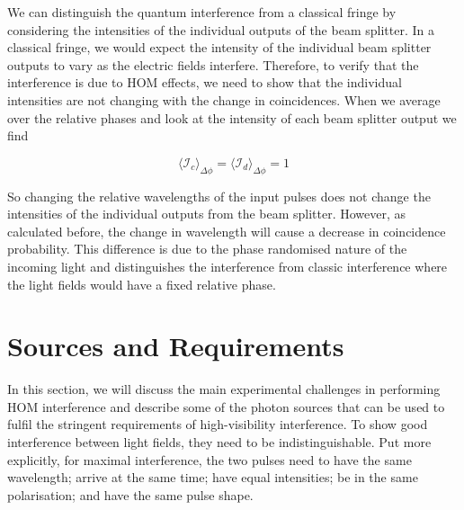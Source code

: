 We can distinguish the quantum interference from a classical fringe by considering the intensities of the individual outputs of the beam splitter. In a classical fringe, we would expect the intensity of the individual beam splitter outputs to vary as the electric fields interfere. Therefore, to verify that the interference is due to \ac{HOM} effects, we need to show that the individual intensities are not changing with the change in coincidences. When we average over the relative phases and look at the intensity of each beam splitter output we find

\begin{equation}
	\langle \mathcal{I}_c \rangle_{\Delta\phi} = \langle \mathcal{I}_d \rangle_{\Delta\phi} = 1
\end{equation}

So changing the relative wavelengths of the input pulses does not change the intensities of the individual outputs from the beam splitter. However, as calculated before, the change in wavelength will cause a decrease in coincidence probability. This difference is due to the phase randomised nature of the incoming light and distinguishes the interference from classic interference where the light fields would have a fixed relative phase.

%

\section{Sources and Requirements}
\label{sec:sources}

In this section, we will discuss the main experimental challenges in performing \ac{HOM} interference and describe some of the photon sources that can be used to fulfil the stringent requirements of high-visibility interference. To show good interference between light fields, they need to be indistinguishable. Put more explicitly, for maximal interference, the two pulses need to have the same wavelength; arrive at the same time; have equal intensities; be in the same polarisation; and have the same pulse shape.

